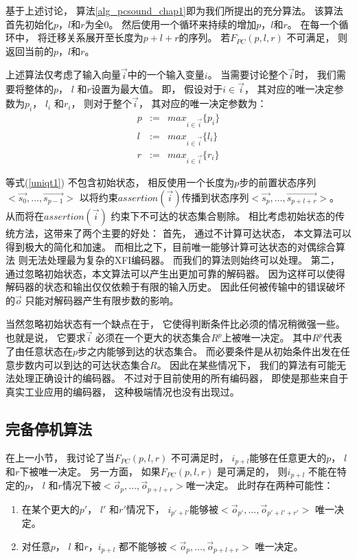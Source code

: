 %

基于上述讨论，
算法\ref{alg_pcsound_chap1}即为我们所提出的充分算法。
该算法首先初始化$p$，$l$和$r$为全0。
然后使用一个循环来持续的增加$p$，$l$和$r$。
在每一个循环中，
将迁移关系展开至长度为$p+l+r$的序列。
若$F_{PC}(p,l,r)$ 不可满足，
则返回当前的$p$，$l$和$r$。


上述算法仅考虑了输入向量$\vec{i}$中的一个输入变量$i$。
当需要讨论整个$\vec{i}$时，
我们需要将整体的$p$， $l$ 和$r$设置为最大值。
即，
假设对于$i\in\vec{i}$，
其对应的唯一决定参数为$p_i$， $l_i$ 和$r_i$，
则对于整个$\vec{i}$，
其对应的唯一决定参数为：
\begin{equation}\label{equ_maxplr}
\begin{array}{ccc}
p & :=  & max_{i\in\vec{i}} \{p_i\}\\
l & :=  & max_{i\in\vec{i}} \{l_i\}\\
r & :=  & max_{i\in\vec{i}} \{r_i\}
\end{array}
\end{equation}

等式(\ref{uniqt1}) 不包含初始状态，
相反使用一个长度为$p$步的前置状态序列$<\vec{s_0},\dots,\vec{s_{p-1}}>$
以将约束$assertion(\vec{i})$传播到状态序列$<\vec{s_p},\dots,\vec{s_{p+l+r}}>$。
从而将在$assertion(\vec{i})$ 约束下不可达的状态集合剔除。
相比考虑初始状态的传统方法，这带来了两个主要的好处：
首先，
通过不计算可达状态，
本文算法可以得到极大的简化和加速。
而相比之下，目前唯一能够计算可达状态的对偶综合算法
则无法处理最为复杂的XFI编码器。
而我们的算法则始终可以处理。
第二，
通过忽略初始状态，本文算法可以产生出更加可靠的解码器。
因为这样可以使得解码器的状态和输出仅仅依赖于有限的输入历史。
因此任何被传输中的错误破坏的$\vec{o}$ 只能对解码器产生有限步数的影响。

当然忽略初始状态有一个缺点在于，
它使得判断条件比必须的情况稍微强一些。
也就是说，
它要求$\vec{i}$ 必须在一个更大的状态集合$R^p$上被唯一决定。
其中$R^p$代表了由任意状态在$p$步之内能够到达的状态集合。
而必要条件是从初始条件出发在任意步数内可以到达的可达状态集合$R$。
因此在某些情况下，
我们的算法有可能无法处理正确设计的编码器。
不过对于目前使用的所有编码器，
即使是那些来自于真实工业应用的编码器，
这种极端情况也没有出现过。


\subsection{完备停机算法}\label{subsec_complete}


在上一小节，
我讨论了当$F_{PC}(p,l,r)$ 不可满足时，
$i_{p+l}$能够在任意更大的$p$， $l$ 和$r$下被唯一决定。
另一方面，
如果$F_{PC}(p,l,r)$ 是可满足的，
则$i_{p+l}$ 不能在特定的$p$， $l$ 和$r$情况下被$<\vec{o}_{p},\dots,\vec{o}_{p+l+r}>$唯一决定。
此时存在两种可能性：
\begin{enumerate}
 \item
在某个更大的$p'$， $l'$ 和$r'$情况下，
$i_{p'+l'}$能够被$<\vec{o}_{p'},\dots,\vec{o}_{p'+l'+r'}>$ 唯一决定。
 \item
对任意$p$， $l$ 和$r$，$i_{p+l}$ 都不能够被$<\vec{o}_{p},\dots,\vec{o}_{p+l+r}>$ 唯一决定。
\end{enumerate}

